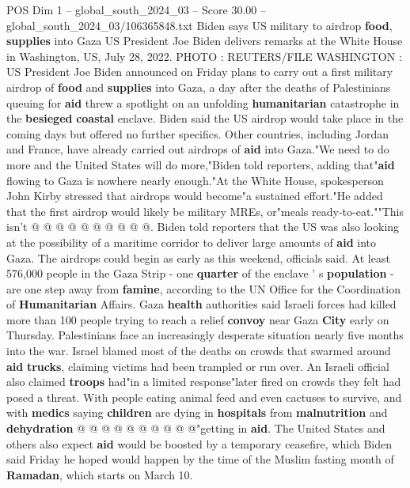 \begin{textsample}{POS Dim 1 – global\_south\_2024\_03 – Score 30.00 – global\_south\_2024\_03/106365848.txt}  \label{ex:f1_pos_019}
Biden says US military to airdrop \textbf{food}, \textbf{supplies} into Gaza US President Joe Biden delivers remarks at the White House in Washington, US, July 28, 2022.
PHOTO : REUTERS/FILE WASHINGTON : US President Joe Biden announced on Friday plans to carry out a first military airdrop of \textbf{food} and \textbf{supplies} into Gaza, a day after the deaths of Palestinians queuing for \textbf{aid} threw a spotlight on an unfolding \textbf{humanitarian} catastrophe in the \textbf{besieged} \textbf{coastal} enclave.
Biden said the US airdrop would take place in the coming days but offered no further specifics.
Other countries, including Jordan and France, have already carried out airdrops of \textbf{aid} into Gaza."We need to do more and the United States will do more,"Biden told reporters, adding that"\textbf{aid} flowing to Gaza is nowhere nearly enough."At the White House, spokesperson John Kirby stressed that airdrops would become"a sustained effort."He added that the first airdrop would likely be military MREs, or"meals ready-to-eat.""This isn't @ @ @ @ @ @ @ @ @ @.
Biden told reporters that the US was also looking at the possibility of a maritime corridor to deliver large amounts of \textbf{aid} into Gaza.
The airdrops could begin as early as this weekend, officials said.
At least 576,000 people in the Gaza Strip - one \textbf{quarter} of the enclave ' s \textbf{population} - are one step away from \textbf{famine}, according to the UN Office for the Coordination of \textbf{Humanitarian} Affairs.
Gaza \textbf{health} authorities said Israeli forces had killed more than 100 people trying to reach a relief \textbf{convoy} near Gaza \textbf{City} early on Thursday.
Palestinians face an increasingly desperate situation nearly five months into the war.
Israel blamed most of the deaths on crowds that swarmed around \textbf{aid} \textbf{trucks}, claiming victims had been trampled or run over.
An Israeli official also claimed \textbf{troops} had"in a limited response"later fired on crowds they felt had posed a threat.
With people eating animal feed and even cactuses to survive, and with \textbf{medics} saying \textbf{children} are dying in \textbf{hospitals} from \textbf{malnutrition} and \textbf{dehydration} @ @ @ @ @ @ @ @ @ @"getting in \textbf{aid}.
The United States and others also expect \textbf{aid} would be boosted by a temporary ceasefire, which Biden said Friday he hoped would happen by the time of the Muslim fasting month of \textbf{Ramadan}, which starts on March 10.

\end{textsample}
